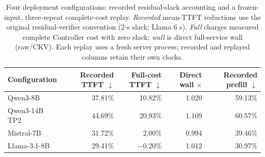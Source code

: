 \begin{table}[t]
\centering\footnotesize
\setlength{\tabcolsep}{3.0pt}
\caption{Four deployment configurations: recorded residual-slack accounting and a frozen-input, three-repeat complete-cost replay. \emph{Recorded} mean-TTFT reductions use the original residual-verifier convention (2-s slack; Llama 6 s). \emph{Full} charges measured complete Controller cost with zero slack; \emph{wall} is direct full-service wall (raw/CKV). Each replay uses a fresh server process; recorded and replayed columns retain their own clocks.}
\label{tab:deployment-width}
\begin{tabular}{@{}lrrrr@{}}
\toprule
Configuration & \shortstack{Recorded\\TTFT $\downarrow$} & \shortstack{Full-cost\\TTFT $\downarrow$} & \shortstack{Direct\\wall $\times$} & \shortstack{Recorded\\prefill $\downarrow$}\\
\midrule
Qwen3-8B & 37.81\% & 10.82\% & 1.020 & 59.13\%\\
Qwen3-14B TP2 & 44.69\% & 20.93\% & 1.109 & 60.57\%\\
Mistral-7B & 31.72\% & 2.00\% & 0.994 & 39.46\%\\
Llama-3.1-8B & 29.41\% & $-0.20$\% & 1.012 & 30.97\%\\
\bottomrule
\end{tabular}
\end{table}
